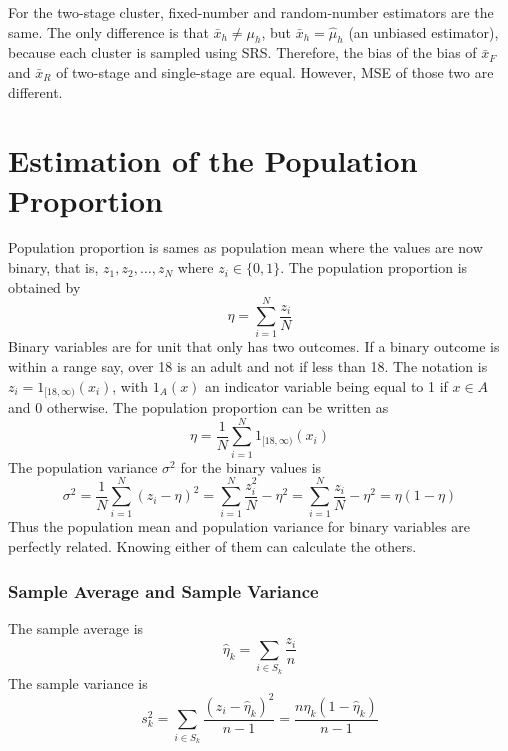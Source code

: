 For the two-stage cluster, fixed-number and random-number estimators are the same. The only difference is that $\bar{x}_h\neq\mu_h$, but $\bar{x}_h=\hat{\mu}_h$ (an unbiased estimator), because each cluster is sampled using SRS. Therefore, the bias
of the bias of $\bar{x}_F$ and $\bar{x}_R$ of two-stage and single-stage are equal. However, MSE of those two are different.

\section{Estimation of the Population Proportion}
Population proportion is sames as population mean where the values are now binary, that is, $z_1,z_2,\ldots,z_N$ where $z_i\in\{0,1\}$. The population proportion is obtained by
\begin{equation}
    \eta = \sum_{i=1}^{N}\frac{z_i}{N}
\end{equation}
Binary variables are for unit that only has two outcomes. If a binary outcome is within a range say, over 18 is an adult and not if less than 18. The notation is $z_i=1_{[18,\infty)}(x_i)$, with $1_A(x)$ an indicator variable being equal to 1 
if $x\in A$ and $0$ otherwise. The population proportion can be written as
\begin{equation*}
    \eta=\frac1N\sum_{i=1}^{N}1_{[18,\infty)}(x_i)
\end{equation*}
The population variance $\sigma^2$ for the binary values is 
\begin{equation}
    \sigma^2=\frac1N\sum_{i=1}^{N}(z_i-\eta)^2=\sum_{i=1}^{N}\frac{z_i^2}{N}-\eta^2=\sum_{i=1}^{N}\frac{z_i}{N}-\eta^2=\eta(1-\eta)
\end{equation}
Thus the population mean and population variance for binary variables are perfectly related. Knowing either of them can calculate the others.
\subsubsection{Sample Average and Sample Variance}
The sample average is 
\begin{equation}
    \hat{\eta}_k=\sum_{i\in S_k}\frac{z_i}{n}
\end{equation}
The sample variance is 
\begin{equation}
    s^2_k=\sum_{i\in S_k}\frac{(z_i-\hat{\eta}_k)^2}{n-1}=\frac{n\hat{\eta}_k(1-\hat{\eta}_k)}{n-1}
\end{equation}

